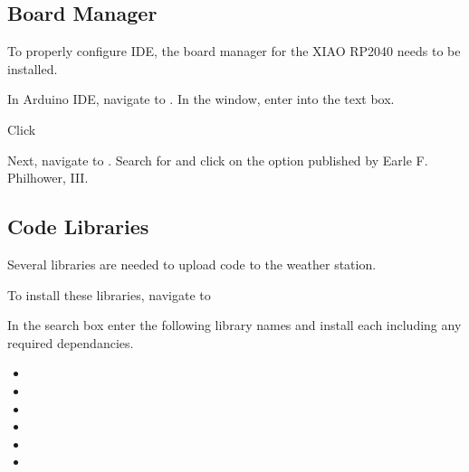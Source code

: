 \documentclass[letterpaper,10pt,english]{sphinxmanual}
\begin{document}
\subsection{Board Manager}
\label{\detokenize{software/install-arduino-ide:board-manager}}
\sphinxAtStartPar
To properly configure IDE, the board manager for the XIAO RP2040 needs to be installed.

\sphinxAtStartPar
In Arduino IDE, navigate to . In the window, enter  into the  text box.


\sphinxAtStartPar
Click 

\sphinxAtStartPar
Next, navigate to . Search for  and click  on the option published by Earle F. Philhower, III.



\subsection{Code Libraries}
\label{\detokenize{software/install-arduino-ide:code-libraries}}
\sphinxAtStartPar
Several libraries are needed  to upload code to the weather station.

\sphinxAtStartPar
To install these libraries, navigate to 

\sphinxAtStartPar
In the search box enter the following library names and install each including any required dependancies.
\begin{itemize}
\item {} 
\sphinxAtStartPar
{}

\item {} 
\sphinxAtStartPar
{}

\item {} 
\sphinxAtStartPar
{}

\item {} 
\sphinxAtStartPar
{}

\item {} 
\sphinxAtStartPar
{}

\item {} 
\sphinxAtStartPar
{}

\end{itemize}
\end{document}
